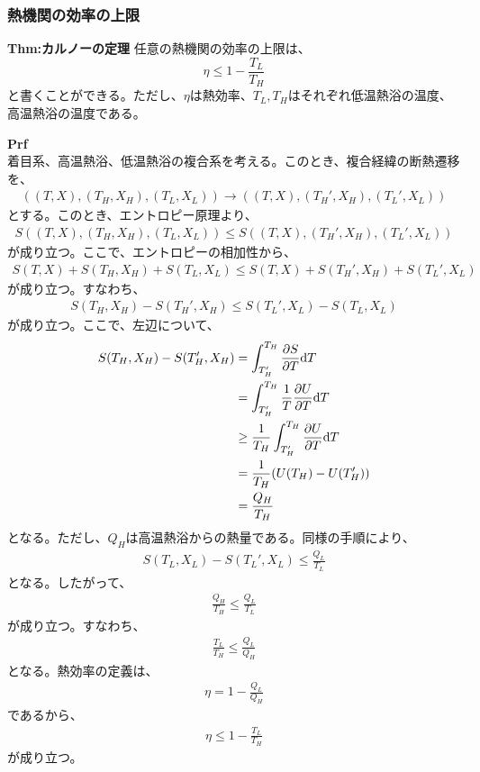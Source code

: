 \documentclass[a4paper,11pt]{jsarticle}
\numberwithin{equation}{section}
\begin{document}
\subsubsection{熱機関の効率の上限}
\begin{itembox}[l]{\textbf{Thm:カルノーの定理}}
  任意の熱機関の効率の上限は、
  \begin{equation}
    \eta \leq 1-\frac{T_L}{T_H}
  \end{equation}
  と書くことができる。ただし、$\eta$は熱効率、$T_L,T_H$はそれぞれ低温熱浴の温度、高温熱浴の温度である。

\end{itembox}
\textbf{Prf}\\
着目系、高温熱浴、低温熱浴の複合系を考える。このとき、複合経緯の断熱遷移を、
\begin{align}
  ((T,X),(T_H,X_H),(T_L,X_L)) \rightarrow ((T,X),(T_H',X_H),(T_L',X_L))
\end{align}
とする。このとき、エントロピー原理より、
\begin{align}
  S((T,X),(T_H,X_H),(T_L,X_L)) \leq S((T,X),(T_H',X_H),(T_L',X_L))
\end{align}
が成り立つ。ここで、エントロピーの相加性から、
\begin{align}
  S(T,X)+S(T_H,X_H)+S(T_L,X_L) \leq S(T,X)+S(T_H',X_H)+S(T_L',X_L)
\end{align}
が成り立つ。すなわち、
\begin{align}
  S(T_H,X_H) - S(T_H',X_H) \leq S(T_L',X_L) - S(T_L,X_L)
\end{align}
が成り立つ。ここで、左辺について、
\begin{align}
  S(T_H,X_H) - S(T_H',X_H) &= \int_{T_H'}^{T_H} \pdv{S}{T} \dd T\\
  &= \int_{T_H'}^{T_H} \frac{1}{T} \pdv{U}{T} \dd T\\
  &\geq \frac{1}{T_H} \int_{T_H'}^{T_H} \pdv{U}{T} \dd T\\
  &= \frac{1}{T_H} (U(T_H)-U(T_H'))\\
  &= \frac{Q_H}{T_H}
\end{align}
となる。ただし、$Q_H$は高温熱浴からの熱量である。同様の手順により、
\begin{align}
  S(T_L,X_L) - S(T_L',X_L) \leq \frac{Q_L}{T_L}
\end{align}
となる。したがって、
\begin{align}
  \frac{Q_H}{T_H} \leq \frac{Q_L}{T_L}
\end{align}
が成り立つ。すなわち、
\begin{align}
  \frac{T_L}{T_H} \leq \frac{Q_L}{Q_H}
\end{align}
となる。熱効率の定義は、
\begin{align}
  \eta = 1 - \frac{Q_L}{Q_H}
\end{align}
であるから、
\begin{align}
  \eta \leq 1 - \frac{T_L}{T_H}
\end{align}
が成り立つ。\hfill\qedsymbol\\
\end{document}
